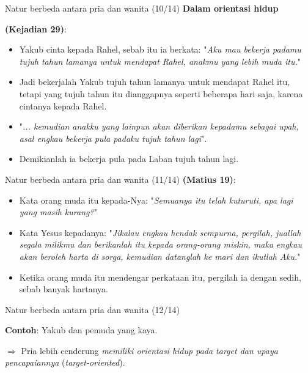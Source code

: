 \documentclass{beamer}
\theoremstyle{mystyle}
\let\emph\relax %
\begin{document}
\begin{frame}{Natur berbeda antara pria dan wanita (10/14)}
	\textbf{Dalam orientasi hidup}
	
	\bigskip
	 \emph{Yakub} \textbf{(Kejadian 29)}:
	\begin{itemize}
		\item<3-> Yakub cinta kepada Rahel, sebab itu ia berkata: "\textit{Aku mau bekerja padamu tujuh tahun lamanya untuk mendapat Rahel, anakmu yang lebih muda itu.}"
		\item<4-> Jadi bekerjalah Yakub tujuh tahun lamanya untuk mendapat Rahel itu, tetapi yang tujuh tahun itu dianggapnya seperti beberapa hari saja, karena cintanya kepada Rahel. 
		\item<5-> "\textit{... kemudian anakku yang lainpun akan diberikan kepadamu sebagai upah, asal engkau bekerja pula padaku tujuh tahun lagi}".
		\item<6-> Demikianlah ia bekerja pula pada Laban tujuh tahun lagi.
	\end{itemize}			
\end{frame}

\begin{frame}{Natur berbeda antara pria dan wanita (11/14)}
\emph{Pemuda yang kaya} \textbf{(Matius 19)}: 
\begin{itemize}
	\item<2-> Kata orang muda itu kepada-Nya: "\textit{Semuanya itu telah kuturuti, apa lagi yang masih kurang?}"
	\item<3-> Kata Yesus kepadanya: "\textit{Jikalau engkau hendak sempurna, pergilah, juallah segala milikmu dan berikanlah itu kepada orang-orang miskin, maka engkau akan beroleh harta di sorga, kemudian datanglah ke mari dan ikutlah Aku.}"
	\item<4-> Ketika orang muda itu mendengar perkataan itu, pergilah ia dengan sedih, sebab banyak hartanya.
\end{itemize}
\end{frame}

\begin{frame}{Natur berbeda antara pria dan wanita (12/14)}
	
	\textbf{Contoh}: Yakub dan pemuda yang kaya.

	\bigskip
	 $\Rightarrow$ Pria lebih cenderung \textit{memiliki orientasi hidup pada target dan upaya pencapaiannya} (\textit{target-oriented}). 

\end{frame}
\end{document}
